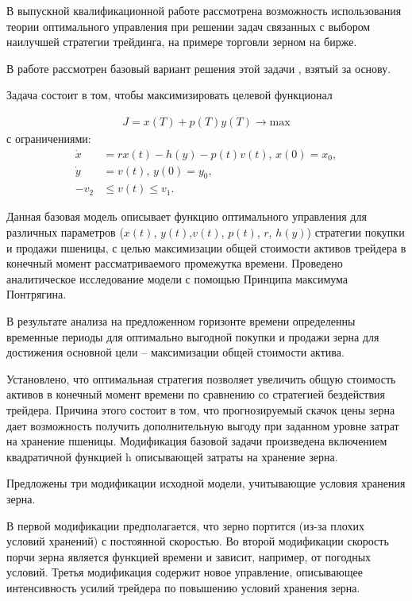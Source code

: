 В выпускной квалификационной работе рассмотрена возможность использования теории оптимального управления при решении задач связанных с выбором наилучшей стратегии трейдинга, на примере торговли зерном на бирже.


В работе рассмотрен базовый вариант решения этой задачи \cite{b8}, взятый за основу. 

Задача состоит в том, чтобы максимизировать целевой функционал

\begin{align}
    J = x(T) + p(T) y(T)\to \mathrm{max} \nonumber
\end{align} 
с ограничениями:
\begin{align}
    \Dot{x} & = r x(t) - h(y) - p(t) v(t),\, x(0) = x_{0}, \nonumber\\
    \Dot{y} & = v(t), \, y(0) = y_{0}, \nonumber \\
    - v_2 & \le v(t) \le v_1. \nonumber
\end{align}    


Данная базовая модель описывает функцию оптимального управления для различных параметров ($x(t)$, $y(t)$,${v(t)}$, $p(t)$, ${r}$, $h(y)$) стратегии покупки и продажи пшеницы, с целью максимизации общей стоимости активов трейдера в конечный момент рассматриваемого промежутка времени. Проведено аналитическое исследование модели с помощью Принципа максимума Понтрягина. 


В результате анализа на предложенном горизонте времени определенны временные периоды для оптимально выгодной покупки и продажи зерна для достижения основной цели – максимизации общей стоимости актива.


Установлено, что оптимальная стратегия позволяет увеличить общую стоимость активов в конечный момент времени по сравнению со стратегией бездействия трейдера. Причина этого состоит в том, что прогнозируемый скачок цены зерна дает возможность получить дополнительную выгоду при заданном уровне затрат на хранение пшеницы. Модификация базовой задачи произведена включением квадратичной функцией h описывающей затраты на хранение зерна.


Предложены три модификации исходной модели, учитывающие условия хранения зерна.


В первой модификации предполагается, что зерно портится (из-за плохих условий хранений) с постоянной скоростью. Во второй модификации скорость порчи зерна является функцией времени и зависит, например, от погодных условий. Третья модификация содержит новое управление, описывающее интенсивность усилий трейдера по повышению условий хранения зерна.
